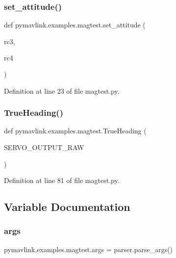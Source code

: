 \subsubsection{\texorpdfstring{set\_attitude()}{set\_attitude()}}
{\footnotesize\ttfamily def pymavlink.\+examples.\+magtest.\+set\+\_\+attitude (\begin{DoxyParamCaption}\item[{}]{rc3,  }\item[{}]{rc4 }\end{DoxyParamCaption})}



Definition at line 23 of file magtest.\+py.

\mbox{\label{namespacepymavlink_1_1examples_1_1magtest_a5318e4afc641238e99eea2d28a2b4128}} 
\subsubsection{\texorpdfstring{TrueHeading()}{TrueHeading()}}
{\footnotesize\ttfamily def pymavlink.\+examples.\+magtest.\+True\+Heading (\begin{DoxyParamCaption}\item[{}]{S\+E\+R\+V\+O\+\_\+\+O\+U\+T\+P\+U\+T\+\_\+\+R\+AW }\end{DoxyParamCaption})}



Definition at line 81 of file magtest.\+py.



\subsection{Variable Documentation}
\mbox{\label{namespacepymavlink_1_1examples_1_1magtest_a3d082598042717821fce72281a19d9f0}} 
\subsubsection{\texorpdfstring{args}{args}}
{\footnotesize\ttfamily pymavlink.\+examples.\+magtest.\+args = parser.\+parse\+\_\+args()}



